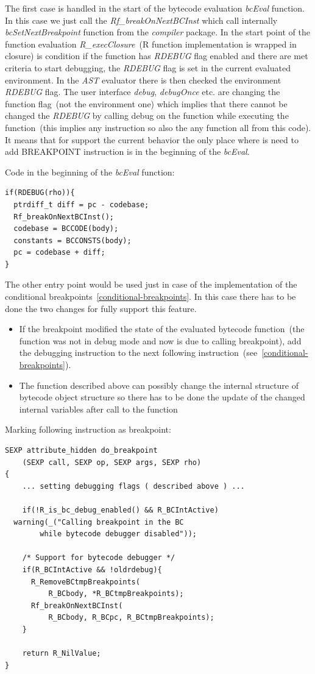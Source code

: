 \documentclass[thesis=M,english]{FITthesis}[2018/10/20]
\begin{document}
The first case is handled in the start of the bytecode evaluation \textit{bcEval} function. In this case we just call the \textit{Rf{\_}breakOnNextBCInst} which call internally \textit{bcSetNextBreakpoint} function from the \textit{compiler} package. In the start point of the function evaluation \textit{R{\_}execClosure}~(R function implementation is wrapped in closure) is condition if the function has \textit{RDEBUG} flag enabled and there are met criteria to start debugging, the \textit{RDEBUG} flag is set in the current evaluated environment. In the \textit{AST} evaluator there is then checked the environment \textit{RDEBUG} flag. The user interface \textit{debug}, \textit{debugOnce} etc. are changing the function flag~(not the environment one) which implies that there cannot be changed the \textit{RDEBUG} by calling debug on the function while executing the function~(this implies any instruction so also the any function all from this code). It means that for support the current behavior the only place where is need to add BREAKPOINT instruction is in the beginning of the \textit{bcEval}.

Code in the beginning of the \textit{bcEval} function:
\begin{lstlisting}
if(RDEBUG(rho)){
  ptrdiff_t diff = pc - codebase;
  Rf_breakOnNextBCInst();
  codebase = BCCODE(body);
  constants = BCCONSTS(body);
  pc = codebase + diff;
}
\end{lstlisting}

The other entry point would be used just in case of the implementation of the conditional breakpoints~\ref{conditional-breakpoints}. In this case there has to be done the two changes for fully support this feature.

\begin{itemize}
	\item If the breakpoint modified the state of the evaluated bytecode function~(the function was not in debug mode and now is due to calling breakpoint), add the debugging instruction to the next following instruction~(see~\ref{conditional-breakpoints}).
	\item The function described above can possibly change the internal structure of bytecode object structure so there has to be done the update of the changed internal variables after call to the function
\end{itemize}


Marking following instruction as breakpoint:
\begin{lstlisting}
SEXP attribute_hidden do_breakpoint
	(SEXP call, SEXP op, SEXP args, SEXP rho)
{
	... setting debugging flags ( described above ) ...

    if(!R_is_bc_debug_enabled() && R_BCIntActive)
  warning(_("Calling breakpoint in the BC 
  		while bytecode debugger disabled"));

    /* Support for bytecode debugger */
    if(R_BCIntActive && !oldrdebug){
      R_RemoveBCtmpBreakpoints(
          R_BCbody, *R_BCtmpBreakpoints);
      Rf_breakOnNextBCInst(
          R_BCbody, R_BCpc, R_BCtmpBreakpoints);
    }

    return R_NilValue;
}
\end{lstlisting}
\end{document}
